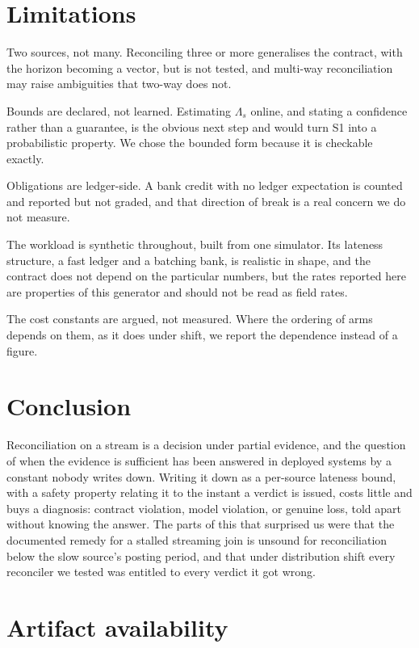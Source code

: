 \documentclass[10pt,conference]{IEEEtran}
\begin{document}
\section{Limitations}

Two sources, not many. Reconciling three or more generalises the contract, with the horizon becoming
a vector, but is not tested, and multi-way reconciliation may
raise ambiguities that two-way does not.

Bounds are declared, not learned. Estimating $\Lambda_s$ online, and stating a
confidence rather than a guarantee, is the obvious next step and would turn S1
into a probabilistic property. We chose the bounded form because it is checkable
exactly.

Obligations are ledger-side. A bank credit with no ledger expectation is
counted and reported but not graded, and that direction of break is a real
concern we do not measure.

The workload is synthetic throughout, built from one simulator. Its lateness structure, a fast ledger and a batching bank, is realistic in
shape, and the
contract does not depend on the particular numbers, but the rates reported here
are properties of this generator and should not be read as field rates.

The cost constants are argued, not measured. Where the ordering of arms depends
on them, as it does under shift, we report the dependence instead of a figure.

\section{Conclusion}

Reconciliation on a stream is a decision under partial evidence, and the
question of when the evidence is sufficient has been answered in deployed
systems by a constant nobody writes down. Writing it down as a per-source lateness bound, with a safety property
relating it to the instant a verdict is issued, costs little and buys a
diagnosis: contract violation, model
violation, or genuine loss, told apart without knowing the answer. The parts of
this that surprised us were that the documented remedy for a stalled streaming
join is unsound for reconciliation below the slow source's posting period, and
that under distribution shift every reconciler we tested was entitled to every
verdict it got wrong.

\section*{Artifact availability}
\end{document}
